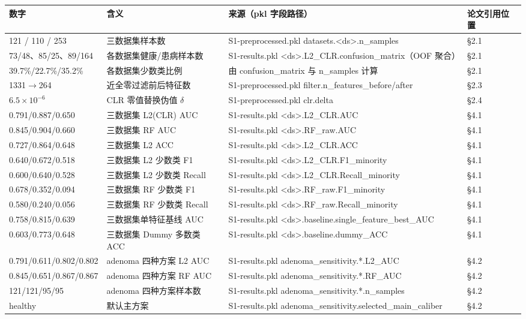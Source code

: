 \documentclass{article}
\begin{document}
\begin{center}
\footnotesize
\begin{tabular}{llll}
\toprule
数字 & 含义 & 来源（pkl 字段路径） & 论文引用位置 \\
\midrule
121 / 110 / 253 & 三数据集样本数 & S1-preprocessed.pkl datasets.<ds>.n\_samples & §2.1 \\
73/48、85/25、89/164 & 各数据集健康/患病样本数 & S1-results.pkl <ds>.L2\_CLR.confusion\_matrix（OOF 聚合） & §2.1 \\
39.7\%/22.7\%/35.2\% & 各数据集少数类比例 & 由 confusion\_matrix 与 n\_samples 计算 & §2.1 \\
1331$\to$264 & 近全零过滤前后特征数 & S1-preprocessed.pkl filter.n\_features\_before/after & §2.3 \\
$6.5\times10^{-6}$ & CLR 零值替换伪值 $\delta$ & S1-preprocessed.pkl clr.delta & §2.4 \\
0.791/0.887/0.650 & 三数据集 L2(CLR) AUC & S1-results.pkl <ds>.L2\_CLR.AUC & §4.1 \\
0.845/0.904/0.660 & 三数据集 RF AUC & S1-results.pkl <ds>.RF\_raw.AUC & §4.1 \\
0.727/0.864/0.648 & 三数据集 L2 ACC & S1-results.pkl <ds>.L2\_CLR.ACC & §4.1 \\
0.640/0.672/0.518 & 三数据集 L2 少数类 F1 & S1-results.pkl <ds>.L2\_CLR.F1\_minority & §4.1 \\
0.600/0.640/0.528 & 三数据集 L2 少数类 Recall & S1-results.pkl <ds>.L2\_CLR.Recall\_minority & §4.1 \\
0.678/0.352/0.094 & 三数据集 RF 少数类 F1 & S1-results.pkl <ds>.RF\_raw.F1\_minority & §4.1 \\
0.580/0.240/0.056 & 三数据集 RF 少数类 Recall & S1-results.pkl <ds>.RF\_raw.Recall\_minority & §4.1 \\
0.758/0.815/0.639 & 三数据集单特征基线 AUC & S1-results.pkl <ds>.baseline.single\_feature\_best\_AUC & §4.1 \\
0.603/0.773/0.648 & 三数据集 Dummy 多数类 ACC & S1-results.pkl <ds>.baseline.dummy\_ACC & §4.1 \\
0.791/0.611/0.802/0.802 & adenoma 四种方案 L2 AUC & S1-results.pkl adenoma\_sensitivity.*.L2\_AUC & §4.2 \\
0.845/0.651/0.867/0.867 & adenoma 四种方案 RF AUC & S1-results.pkl adenoma\_sensitivity.*.RF\_AUC & §4.2 \\
121/121/95/95 & adenoma 四种方案样本数 & S1-results.pkl adenoma\_sensitivity.*.n\_samples & §4.2 \\
healthy & 默认主方案 & S1-results.pkl adenoma\_sensitivity.selected\_main\_caliber & §4.2 \\

\end{tabular}
\end{center}
\end{document}
